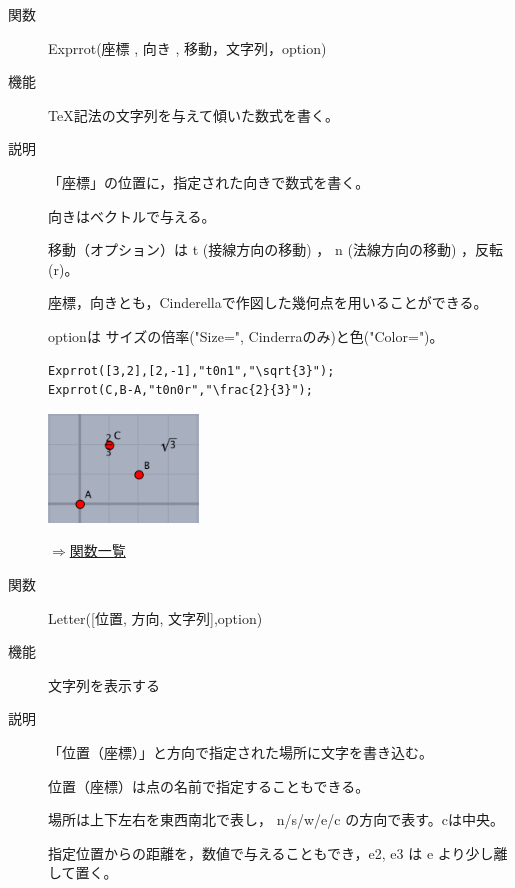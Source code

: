\documentclass[papersize,a4paper,12pt,uplatex]{jsarticle}
\begin{document}
\begin{description}
\vspace{\baselineskip}
\hypertarget{exprrot}{}
\item[関数]Exprrot(座標 , 向き , 移動，文字列，option)
\item[機能]\TeX 記法の文字列を与えて傾いた数式を書く。
\item[説明]「座標」の位置に，指定された向きで数式を書く。

向きはベクトルで与える。

移動（オプション）は t (接線方向の移動) ， n (法線方向の移動) ，反転 (r)。

座標，向きとも，Cinderellaで作図した幾何点を用いることができる。

optionは サイズの倍率("Size=", Cinderraのみ)と色("Color=")。

\begin{verbatim}
Exprrot([3,2],[2,-1],"t0n1","\sqrt{3}");
Exprrot(C,B-A,"t0n0r","\frac{2}{3}");
\end{verbatim}

\vspace{\baselineskip}
\hspace{10mm}\includegraphics[bb=0.00 0.00 181.01 131.01,width=4cm]{Fig/exprrot.pdf} \hspace{10mm} 

\begin{flushright}\hyperlink{functionlist}{$\Rightarrow$関数一覧}\end{flushright}

\vspace{\baselineskip}
\hypertarget{letter}{}\item[関数]Letter([位置, 方向, 文字列],option)
\item[機能]文字列を表示する
\item[説明]「位置（座標）」と方向で指定された場所に文字を書き込む。

位置（座標）は点の名前で指定することもできる。

場所は上下左右を東西南北で表し， n/s/w/e/c の方向で表す。cは中央。

指定位置からの距離を，数値で与えることもでき，e2, e3 は e より少し離して置く。


\end{description}
\end{document}
